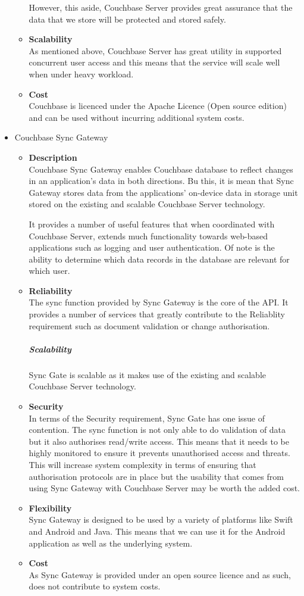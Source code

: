 \documentclass[a4paper,10pt]{article}
\begin{document}
\begin{itemize}
\begin{itemize}
				However, this aside, Couchbase Server provides great assurance that the data that we store will be protected and stored safely.
				\item \textbf{Scalability}\\
				As mentioned above, Couchbase Server has great utility in supported concurrent user access and this means that the service will scale well when under heavy workload.
				\item \textbf{Cost}\\
				Couchbase is licenced under the Apache Licence (Open source edition) and can be used without incurring additional system costs.
			\end{itemize}

		\item Couchbase Sync Gateway
			\begin{itemize}
				\item \textbf{Description}\\
				Couchbase Sync Gateway enables Couchbase database to reflect changes in an application's data in both directions. Bu this, it is mean that Sync Gateway stores data from the applications' on-device data in storage unit stored on the existing and scalable Couchbase Server technology.

				It provides a number of useful features that when coordinated with Couchbase Server, extends much functionality towards web-based applications such as logging and user authentication. Of note is the ability to determine which data records in the database are relevant for which user.
				\item \textbf{Reliability}\\
				The sync function provided by Sync Gateway is the core of the API. It provides a number of services that greatly contribute to the Reliablity requirement such as document validation or change authorisation.		\subparagraph{Scalability}
				Sync Gate is scalable as it makes use of the existing and scalable Couchbase Server technology.
				\item \textbf{Security}\\
				In terms of the Security requirement, Sync Gate has one issue of contention. The sync function is not only able to do validation of data but it also authorises read/write access. This means that it needs to be highly monitored to ensure it prevents unauthorised access and threats. This will increase system complexity in terms of ensuring that authorisation protocols are in place but the usability that comes from using Sync Gateway with Couchbase Server may be worth the added cost.
				\item \textbf{Flexibility}\\
				Sync Gateway is designed to be used by a variety of platforms like Swift and Android and Java. This means that we can use it for the Android application as well as the underlying system.
				\item \textbf{Cost}\\
				As Sync Gateway is provided under an  open source licence and as such, does not contribute to system costs.
			\end{itemize}
	\end{itemize}
\end{document}
